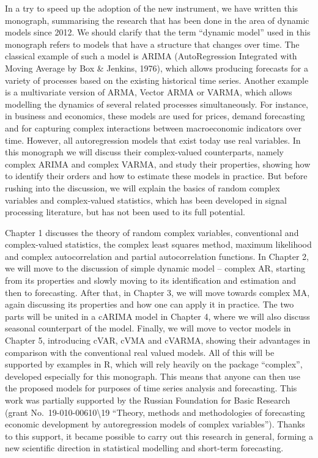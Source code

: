 \documentclass[
]{book}
\begin{document}
In a try to speed up the adoption of the new instrument, we have written this monograph, summarising the research that has been done in the area of dynamic models since 2012. We should clarify that the term ``dynamic model'' used in this monograph refers to models that have a structure that changes over time. The classical example of such a model is ARIMA (AutoRegression Integrated with Moving Average by Box \& Jenkins, 1976), which allows producing forecasts for a variety of processes based on the existing historical time series. Another example is a multivariate version of ARMA, Vector ARMA or VARMA, which allows modelling the dynamics of several related processes simultaneously. For instance, in business and economics, these models are used for prices, demand forecasting and for capturing complex interactions between macroeconomic indicators over time.
However, all autoregression models that exist today use real variables. In this monograph we will discuss their complex-valued counterparts, namely complex ARIMA and complex VARMA, and study their properties, showing how to identify their orders and how to estimate these models in practice. But before rushing into the discussion, we will explain the basics of random complex variables and complex-valued statistics, which has been developed in signal processing literature, but has not been used to its full potential.

Chapter 1 discusses the theory of random complex variables, conventional and complex-valued statistics, the complex least squares method, maximum likelihood and complex autocorrelation and partial autocorrelation functions. In Chapter 2, we will move to the discussion of simple dynamic model -- complex AR, starting from its properties and slowly moving to its identification and estimation and then to forecasting. After that, in Chapter 3, we will move towards complex MA, again discussing its properties and how one can apply it in practice. The two parts will be united in a cARIMA model in Chapter 4, where we will also discuss seasonal counterpart of the model. Finally, we will move to vector models in Chapter 5, introducing cVAR, cVMA and cVARMA, showing their advantages in comparison with the conventional real valued models. All of this will be supported by examples in R, which will rely heavily on the package ``complex'', developed especially for this monograph. This means that anyone can then use the proposed models for purposes of time series analysis and forecasting.
This work was partially supported by the Russian Foundation for Basic Research (grant No.~19-010-00610\textbackslash19 ``Theory, methods and methodologies of forecasting economic development by autoregression models of complex variables''). Thanks to this support, it became possible to carry out this research in general, forming a new scientific direction in statistical modelling and short-term forecasting.
\end{document}
